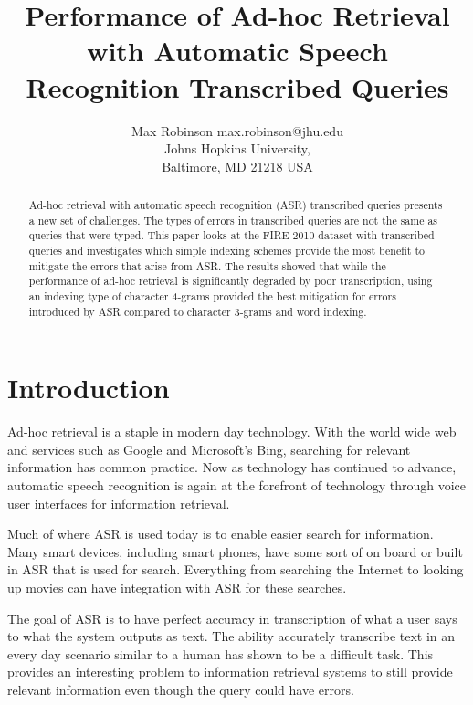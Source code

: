 \documentclass[jair, twoside,11pt,theapa]{article}
\begin{document}
\title{Performance of Ad-hoc Retrieval with Automatic Speech Recognition Transcribed Queries}

\author{\name Max Robinson \email max.robinson@jhu.edu \\
       \addr Johns Hopkins University,\\
       Baltimore, MD 21218 USA
}

\maketitle

\begin{abstract}
\label{Abstract}
Ad-hoc retrieval with automatic speech recognition (ASR) transcribed queries presents a new set of challenges. The types of errors in transcribed queries are not the same as queries that were typed. This paper looks at the FIRE 2010 dataset with transcribed queries and investigates which simple indexing schemes provide the most benefit to mitigate the errors that arise from ASR. The results showed that while the performance of ad-hoc retrieval is significantly degraded by poor transcription, using an indexing type of character 4-grams provided the best mitigation for errors introduced by ASR compared to character 3-grams and word indexing. 

\end{abstract}


\section{Introduction}
\label{Introduction}
Ad-hoc retrieval is a staple in modern day technology. With the world wide web and services such as Google and Microsoft's Bing, searching for relevant information has common practice. Now as technology has continued to advance, automatic speech recognition is again at the forefront of technology through voice user interfaces for information retrieval. 

Much of where ASR is used today is to enable easier search for information. Many smart devices, including smart phones, have some sort of on board or built in ASR that is used for search. Everything from searching the Internet to looking up movies can have integration with ASR for these searches.

The goal of ASR is to have perfect accuracy in transcription of what a user says to what the system outputs as text. The ability accurately transcribe text in an every day scenario similar to a human has shown to be a difficult task. This provides an interesting problem to information retrieval systems to still provide relevant information even though the query could have errors. 
\end{document}
